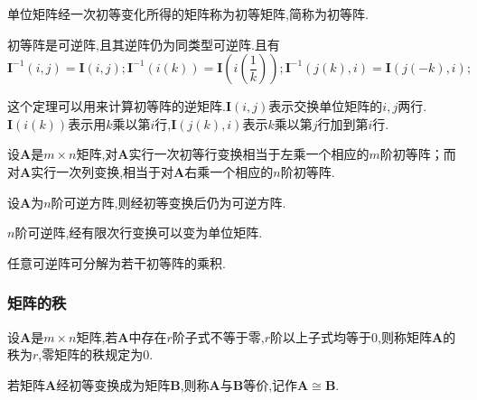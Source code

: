 \begin{definition}
    单位矩阵经一次初等变化所得的矩阵称为初等矩阵,简称为初等阵.
\end{definition}

\begin{ttheorem}
    初等阵是可逆阵,且其逆阵仍为同类型可逆阵.且有
    \begin{equation*}
        \mathbf{I}^{-1}(i,j)=\mathbf{I}(i,j);
        \mathbf{I}^{-1}(i(k))=\mathbf{I}(i(\frac{1}{k}));
        \mathbf{I}^{-1}(j(k),i)=\mathbf{I}(j(-k),i);
    \end{equation*}
\end{ttheorem}

这个定理可以用来计算初等阵的逆矩阵.$\mathbf{I}(i,j)$表示交换单位矩阵的$i,j$两行.$\mathbf{I}(i(k))$表示用$k$乘以第$i$行,$\mathbf{I}(j(k),i)$表示$k$乘以第$j$行加到第$i$行.

\begin{ttheorem}
    设$\mathbf{A}$是$m\times n$矩阵,对$\mathbf{A}$实行一次初等行变换相当于左乘一个相应的$m$阶初等阵；而对$\mathbf{A}$实行一次列变换,相当于对$\mathbf{A}$右乘一个相应的$n$阶初等阵.
\end{ttheorem}

\begin{ttheorem}
    设$\mathbf{A}$为$n$阶可逆方阵,则经初等变换后仍为可逆方阵.
\end{ttheorem}

\begin{ttheorem}
    $n$阶可逆阵,经有限次行变换可以变为单位矩阵.
\end{ttheorem}

\begin{ttheorem}
    任意可逆阵可分解为若干初等阵的乘积.
\end{ttheorem}

\subsubsection{矩阵的秩}

\begin{definition}
    设$\mathbf{A}$是$m\times n$矩阵,若$\mathbf{A}$中存在$r$阶子式不等于零,$r$阶以上子式均等于0,则称矩阵$\mathbf{A}$的秩为$r$,零矩阵的秩规定为0.
\end{definition}

\begin{definition}
    若矩阵$\mathbf{A}$经初等变换成为矩阵$\mathbf{B}$,则称$\mathbf{A}$与$\mathbf{B}$等价,记作$\mathbf{A}\cong \mathbf{B}$.
\end{definition}

